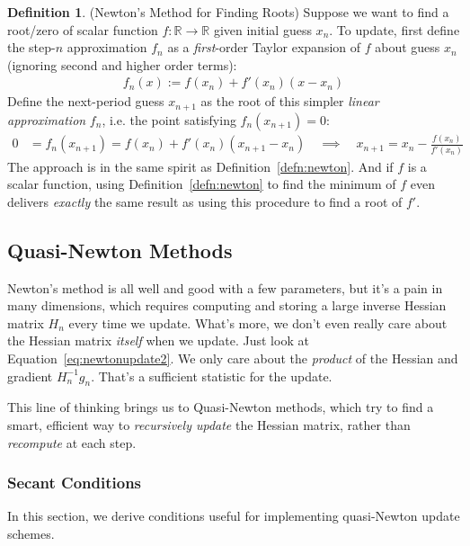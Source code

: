 \documentclass[12pt]{book}
\numberwithin{equation}{section} %
\theoremstyle{plain}
\theoremstyle{definition}
\newtheorem{defn}[thm]{Definition}
\theoremstyle{remark}
\newcommand{\ra}{\rightarrow}
\newcommand{\R}{\mathbb{R}}
\begin{document}
\begin{defn}(Newton's Method for Finding Roots)
Suppose we want to find a root/zero of scalar function $f:\R\ra\R$ given
initial guess $x_n$.
To update, first define the step-$n$ approximation $f_n$ as a
\emph{first}-order Taylor expansion of $f$ about guess $x_n$ (ignoring
second and higher order terms):
\begin{align*}
  f_n(x) := f(x_n) + f'(x_n)(x-x_n)
\end{align*}
Define the next-period guess $x_{n+1}$ as the root of this simpler
\emph{linear approximation} $f_n$, i.e. the point satisfying
$f_n(x_{n+1})=0$:
\begin{align}
  0 &= f_n(x_{n+1})
  = f(x_n) + f'(x_n)(x_{n+1}-x_n)
  \quad\implies\quad
  x_{n+1} = x_n - \frac{f(x_n)}{f'(x_n)}
\end{align}
The approach is in the same spirit as Definition~\ref{defn:newton}.
And if $f$ is a scalar function, using Definition~\ref{defn:newton} to
find the minimum of $f$ even delivers \emph{exactly} the same result as
using this procedure to find a root of $f'$.
\end{defn}


\clearpage
\subsection{Quasi-Newton Methods}

Newton's method is all well and good with a few parameters, but it's a
pain in many dimensions, which requires computing and storing a large
inverse Hessian matrix $H_n$ every time we update. What's more, we don't
even really care about the Hessian matrix \emph{itself} when we update.
Just look at Equation~\ref{eq:newtonupdate2}. We only care about the
\emph{product} of the Hessian and gradient $H_n^{-1} g_n$. That's a
sufficient statistic for the update.

This line of thinking brings us to Quasi-Newton methods, which try to
find a smart, efficient way to \emph{recursively update} the Hessian
matrix, rather than \emph{recompute} at each step.

\subsubsection{Secant Conditions}

In this section, we derive conditions useful for implementing
quasi-Newton update schemes.
\end{document}
